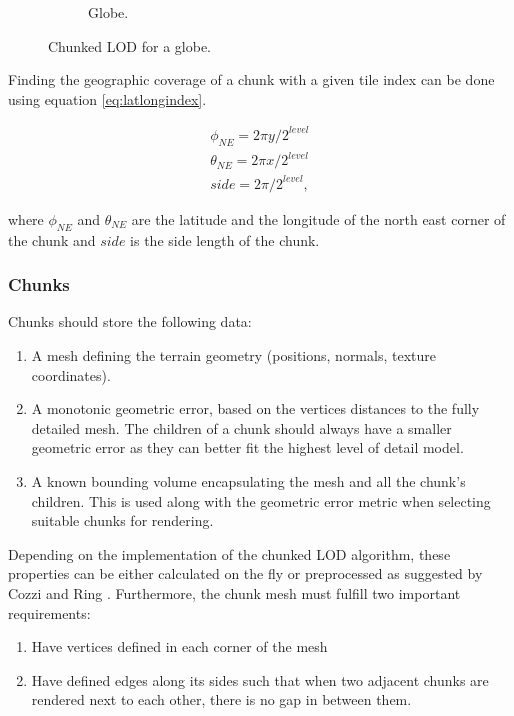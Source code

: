 \begin{figure}[htbp]
\begin{subfigure}[b]{0.2\textwidth}
        \caption{Globe.}
    \end{subfigure}
    \caption{Chunked LOD for a globe.}
    \label{fig:chunkedlod}
\end{figure}

Finding the geographic coverage of a chunk with a given tile index can be done using equation \ref{eq:latlongindex}.

\begin{equation}
\label{eq:latlongindex}
\begin{split}
\phi_{NE} = 2\pi y / 2^{level} \\
\theta_{NE} = 2\pi x / 2^{level} \\
side = 2\pi / 2^{level},
\end{split} 
\end{equation}

where $\phi_{NE}$ and $\theta_{NE}$ are the latitude and the longitude of the north east corner of the chunk and $side$ is the side length of the chunk.

\subsubsection{Chunks}
Chunks should store the following data:

\begin{enumerate}
    \item A mesh defining the terrain geometry (positions, normals, texture coordinates). 
    \item A monotonic geometric error, based on the vertices distances to the fully detailed mesh. The children of a chunk should always have a smaller geometric error as they can better fit the highest level of detail model.
    \item A known bounding volume encapsulating the mesh and all the chunk's children. This is used along with the geometric error metric when selecting suitable chunks for rendering.
\end{enumerate}

Depending on the implementation of the chunked LOD algorithm, these properties can be either calculated on the fly or preprocessed as suggested by Cozzi and Ring \cite[p. 447]{cozzi11}. Furthermore, the chunk mesh must fulfill two important requirements: 

\begin{enumerate}
    \item Have vertices defined in each corner of the mesh
    \item Have defined edges along its sides such that when two adjacent chunks are rendered next to each other, there is no gap in between them.
\end{enumerate}

